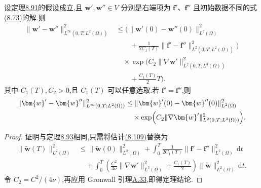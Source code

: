 \begin{theorem}[弱解的稳定性]
\label{thm:smagorinsky-weak-solution-stability}
设定理\hyperref[thm:smagorinsky-weak-solution-existence]{8.91}的假设成立,且
$\bm{w}',\bm{w}''\in V$ 分别是右端项为 $\bm{f}'$、$\bm{f}''$ 且初始数据不同的式\hyperref[eq:smagorinsky-weak-form]{(8.73)}的解.则
\[
\begin{aligned}
 \|\bm{w}'-\bm{w}''\|_{L^\infty(0,T;L^2(\Omega))}^2
 &\le\Biggl(
       \|\bm{w}'(0)-\bm{w}''(0)\|_{L^2(\Omega)}^2\\
 &\qquad+\frac{1}{2C_1(T)}
       \|\bm{f}'-\bm{f}''\|_{L^2(0,T;L^2(\Omega))}^2
       \Biggr)\\
 &\quad\times\exp\Biggl(
        C_2\|\nabla\bm{w}'\|_{L^2(0,T;L^3(\Omega))}^2\\
  &\qquad+\frac{C_1(T)}{2}T\Biggr).
\end{aligned}
\]
其中 $C_1(T),C_2>0$,且 $C_1(T)$ 可以任意选取.若 $\bm{f}'=\bm{f}''$,则
\[
\begin{aligned}
 \|\bm{w}'-\bm{w}''\|_{L^\infty(0,T;L^2(\Omega))}^2
 &\le\|\bm{w}'(0)-\bm{w}''(0)\|_{L^2(\Omega)}^2\\
 &\quad\times\exp\Bigl(C_2\|\nabla\bm{w}'\|_{L^2(0,T;L^3(\Omega))}^2\Bigr).
\end{aligned}
\]
\begin{proof}
证明与定理\hyperref[thm:smagorinsky-weak-solution-uniqueness]{8.93}相同,只需将估计\hyperref[eq:smagorinsky-uniqueness-gronwall-estimate]{(8.109)}替换为
\[
\begin{aligned}
 \|\widetilde{\bm{w}}(T)\|_{L^2(\Omega)}^2
 &\le \|\widetilde{\bm{w}}(0)\|_{L^2(\Omega)}^2
   +\int_0^T\frac{1}{2C_1(T)}
       \|\bm{f}'-\bm{f}''\|_{L^2(\Omega)}^2\,\mathrm{d}t\\
 &\quad+\int_0^T\left(
       \frac{C^2}{4\nu}\|\nabla\bm{w}'\|_{L^3(\Omega)}^2
       +\frac{C_1(T)}2\right)
       \|\widetilde{\bm{w}}\|_{L^2(\Omega)}^2\,\mathrm{d}t.
\end{aligned}
\]
令 $C_2=C^2/(4\nu)$,再应用 Gronwall 引理\hyperref[thm:appendix-a-33]{A.33},即得定理结论.
\end{proof}
\end{theorem}

